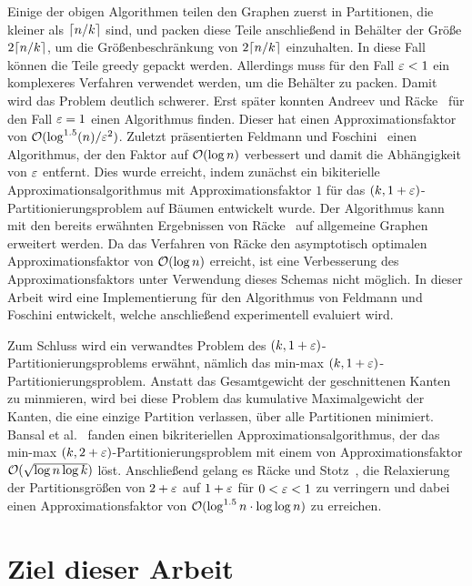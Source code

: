 Einige der obigen Algorithmen teilen den Graphen zuerst in Partitionen, die kleiner als $\lceil n/k\rceil$ sind, und packen diese Teile anschließend in Behälter der Größe $2 \lceil n/k\rceil$, um die Größenbeschränkung von $2 \lceil n/k\rceil$ einzuhalten.
In diese Fall können die Teile greedy gepackt werden.
Allerdings muss für den Fall $\varepsilon < 1$ ein komplexeres Verfahren verwendet werden, um die Behälter zu packen. 
Damit wird das Problem deutlich schwerer.
Erst später konnten Andreev und Räcke~\cite{ar06} für den Fall $\varepsilon = 1$ einen Algorithmus finden.
Dieser hat einen Approximationsfaktor von $\mathcal{O}(\log^{1.5}(n)/\varepsilon^2)$.
Zuletzt präsentierten Feldmann und Foschini~\cite{FF15} einen Algorithmus, der den Faktor auf $\mathcal{O}(\log n)$ verbessert und damit die Abhängigkeit von $\varepsilon$ entfernt.
Dies wurde erreicht, indem zunächst ein bikiterielle Approximationsalgorithmus mit Approximationsfaktor $1$ für das $(k,1+\varepsilon)$\hyp Partitionierungsproblem auf Bäumen entwickelt wurde.
Der Algorithmus kann mit den bereits erwähnten Ergebnissen von Räcke~\cite{rc08} auf allgemeine Graphen erweitert werden.
Da das Verfahren von Räcke den asymptotisch optimalen Approximationsfaktor von $\mathcal{O}(\log n)$ erreicht, ist eine Verbesserung des Approximationsfaktors unter Verwendung dieses Schemas nicht möglich.
In dieser Arbeit wird eine Implementierung für den Algorithmus von Feldmann und Foschini entwickelt, welche anschließend experimentell evaluiert wird.

Zum Schluss wird ein verwandtes Problem des $(k, 1+\varepsilon)$\hyp Partitionierungsproblems erwähnt, nämlich das min-max $(k, 1+\varepsilon)$\hyp Partitionierungsproblem.
Anstatt das Gesamtgewicht der geschnittenen Kanten zu minmieren, wird bei diese Problem das kumulative Maximalgewicht der Kanten, die eine einzige Partition verlassen, über alle Partitionen minimiert.
Bansal et al.~\cite{BFK+11} fanden einen bikriteriellen Approximationsalgorithmus, der das min-max $(k, 2 + \varepsilon)$\hyp Partitionierungsproblem mit einem von Approximationsfaktor $\mathcal{O}(\sqrt{\log n \log k})$ löst.
Anschließend gelang es Räcke und Stotz~\cite{RS16}, die Relaxierung der Partitionsgrößen von $2 + \varepsilon$ auf $1 + \varepsilon$ für $0 < \varepsilon < 1$ zu verringern und dabei einen Approximationsfaktor von $\mathcal{O}(\log^{1.5} n \cdot \log \log n)$ zu erreichen.

\section{Ziel dieser Arbeit}
